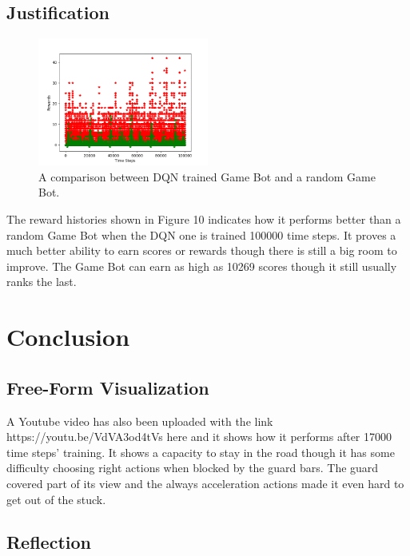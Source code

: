 \documentclass[a4paper]{article}
\begin{document}
\subsection{Justification}

\begin{figure}[h]
\centering
\includegraphics[width=0.5\textwidth]{reward_history_cmp}
\caption{A comparison between DQN trained Game Bot and a random Game Bot.}
\end{figure}

The reward histories shown in Figure 10 indicates how it performs better than a random Game Bot when the DQN one is trained 100000 time steps. It proves a much better ability to earn scores or rewards though there is still a big room to improve. The Game Bot can earn as high as 10269 scores though it still usually ranks the last.

\section{Conclusion}

\subsection{Free-Form Visualization}

A Youtube video has also been uploaded with the link https://youtu.be/VdVA3od4tVs here and it shows how it performs after 17000 time steps' training. It shows a capacity to stay in the road though it has some difficulty choosing right actions when blocked by the guard bars. The guard covered part of its view and the always acceleration actions made it even hard to get out of the stuck.

\subsection{Reflection}
\end{document}
